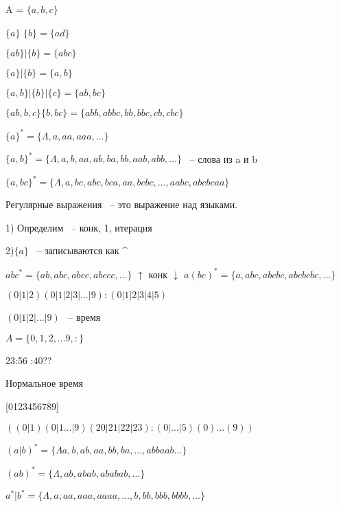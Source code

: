 \documentclass[russian]{lecture-notes}
\begin{document}
	\begin{example}

		A = $\{a,b,c\}$

		$\{a\}$ \qquad $\{b\} = \{ad\}$

		$\{ab\}|\{b\}=\{abc\}$

		$\{a\}|\{b\} = \{a,b\}$

		$\{a,b\}|\{b\}|\{c\} = \{ab,bc\}$

		$\{ab,b,c\}\{b,bc\} = \{abb,abbc,bb,bbc,cb,cbc\}$

		$\{a\}^{*} = \{\Lambda,a,aa,aaa,\dots \} $

		$\{a,b\}^{*} = \{\Lambda,a,b,aa,ab,ba,bb,aab,abb,\dots \}$ ~-- слова из a и b

		$\{a,bc\}^{*} = \{\Lambda,a,bc,abc,bca,aa,bcbc,\dots,aabc,abcbcaa \}$

		\end{example}

	\begin{definition}

		Регулярные выражения ~-- это выражение над языками.

		\end{definition}

	1) Определим ~-- конк, 1, итерация

	2)$\{a\} $ ~-- записываются как ^

	\begin{example}

		$abc^{*} = \{ ab,abc,abcc,abccc,\dots \}$
		$\uparrow$
		конк
		$\downarrow$
		$a(bc)^{*} = \{ a,abc,abcbc,abcbcbc,\dots\}$

		$(0|1|2)(0|1|2|3|\dots|9):(0|1|2|3|4|5)$

		$(0|1|2|\dots|9)$ ~-- время
		\end{example}

	$A = \{ 0,1,2,\dots 9,:\}$

	23:56 :40??

	Нормальное время

	[0123456789]

	$((0|1)(0|1\dots|9)(20|21|22|23):(0|\dots|5)(0)\dots(9))$

	\begin{example}

	$(a|b)^{*} = \{ \Lambda a,b,ab,aa,bb,ba,\dots,abbaab\dots \}$

		$(ab)^{*} = \{ \Lambda, ab,abab,ababab,\dots \}$

		$a^{*}|b^{*} = \{ \Lambda,a,aa,aaa,aaaa,\dots,b,bb,bbb,bbbb,\dots \}$

		\end{example}
\end{document}
